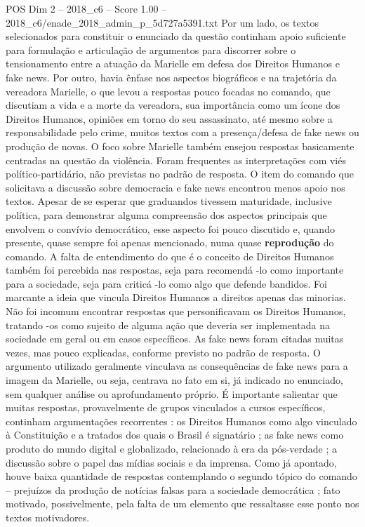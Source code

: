 \begin{textsample}{POS Dim 2 – 2018\_c6 – Score 1.00 – 2018\_c6/enade\_2018\_admin\_p\_5d727a5391.txt}
Por um lado, os textos selecionados para constituir o enunciado da questão continham apoio suficiente para formulação e articulação de argumentos para discorrer sobre o tensionamento entre a atuação da Marielle em defesa dos Direitos Humanos e fake news.
Por outro, havia ênfase nos aspectos biográficos e na trajetória da vereadora Marielle, o que levou a respostas pouco focadas no comando, que discutiam a vida e a morte da vereadora, sua importância como um ícone dos Direitos Humanos, opiniões em torno do seu assassinato, até mesmo sobre a responsabilidade pelo crime, muitos textos com a presença/defesa de fake news ou produção de novas.
O foco sobre Marielle também ensejou respostas basicamente centradas na questão da violência.
Foram frequentes as interpretações com viés político-partidário, não previstas no padrão de resposta.
O item do comando que solicitava a discussão sobre democracia e fake news encontrou menos apoio nos textos.
Apesar de se esperar que graduandos tivessem maturidade, inclusive política, para demonstrar alguma compreensão dos aspectos principais que envolvem o convívio democrático, esse aspecto foi pouco discutido e, quando presente, quase sempre foi apenas mencionado, numa quase \textbf{reprodução} do comando.
A falta de entendimento do que é o conceito de Direitos Humanos também foi percebida nas respostas, seja para recomendá -lo como importante para a sociedade, seja para criticá -lo como algo que defende bandidos.
Foi marcante a ideia que vincula Direitos Humanos a direitos apenas das minorias.
Não foi incomum encontrar respostas que personificavam os Direitos Humanos, tratando -os como sujeito de alguma ação que deveria ser implementada na sociedade em geral ou em casos específicos.
As fake news foram citadas muitas vezes, mas pouco explicadas, conforme previsto no padrão de resposta.
O argumento utilizado geralmente vinculava as consequências de fake news para a imagem da Marielle, ou seja, centrava no fato em si, já indicado no enunciado, sem qualquer análise ou aprofundamento próprio.
É importante salientar que muitas respostas, provavelmente de grupos vinculados a cursos específicos, continham argumentações recorrentes : os Direitos Humanos como algo vinculado à Constituição e a tratados dos quais o Brasil é signatário ; as fake news como produto do mundo digital e globalizado, relacionado à era da pós-verdade ; a discussão sobre o papel das mídias sociais e da imprensa.
Como já apontado, houve baixa quantidade de respostas contemplando o segundo tópico do comando – prejuízos da produção de notícias falsas para a sociedade democrática ; fato motivado, possivelmente, pela falta de um elemento que ressaltasse esse ponto nos textos motivadores.

\end{textsample}
